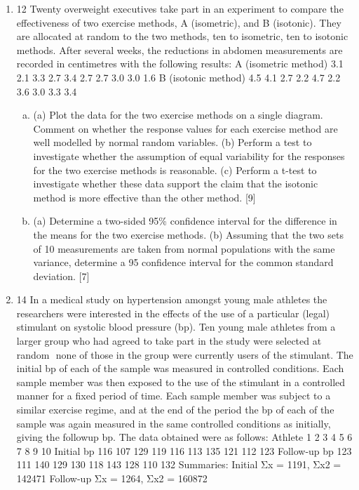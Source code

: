 \documentclass[a4paper,12pt]{article}
\begin{document}
\begin{enumerate}
\item 12 Twenty overweight executives take part in an experiment to compare the
effectiveness of two exercise methods, A (isometric), and B (isotonic). They are
allocated at random to the two methods, ten to isometric, ten to isotonic methods.
After several weeks, the reductions in abdomen measurements are recorded in
centimetres with the following results:
A (isometric method) 3.1 2.1 3.3 2.7 3.4 2.7 2.7 3.0 3.0 1.6
B (isotonic method) 4.5 4.1 2.7 2.2 4.7 2.2 3.6 3.0 3.3 3.4
\begin{enumerate}[(a)]
\item (a) Plot the data for the two exercise methods on a single diagram.
Comment on whether the response values for each exercise method
are well modelled by normal random variables.
(b) Perform a test to investigate whether the assumption of equal
variability for the responses for the two exercise methods is
reasonable.
(c) Perform a t-test to investigate whether these data support the
claim that the isotonic method is more effective than the other
method. [9]
\item (a) Determine a two-sided 95\% confidence interval for the difference in
the means for the two exercise methods.
(b) Assuming that the two sets of 10 measurements are taken from
normal populations with the same variance, determine a 95%
confidence interval for the common standard deviation. [7]
\end{enumerate}

\item 14 In a medical study on hypertension amongst young male athletes the researchers
were interested in the effects of the use of a particular (legal) stimulant on systolic
blood pressure (bp).
Ten young male athletes from a larger group who had agreed to take part in the
study were selected at random  none of those in the group were currently users of
the stimulant. The initial bp of each of the sample was measured in controlled
conditions. Each sample member was then exposed to the use of the stimulant in a
controlled manner for a fixed period of time. Each sample member was subject to a
similar exercise regime, and at the end of the period the bp of each of the sample
was again measured in the same controlled conditions as initially, giving the followup
bp.
The data obtained were as follows:
Athlete 1 2 3 4 5 6 7 8 9 10
Initial bp 116 107 129 119 116 113 135 121 112 123
Follow-up bp 123 111 140 129 130 118 143 128 110 132
Summaries: Initial Σx = 1191, Σx2 = 142471 Follow-up Σx = 1264, Σx2 = 160872


\end{enumerate}
\end{document}
